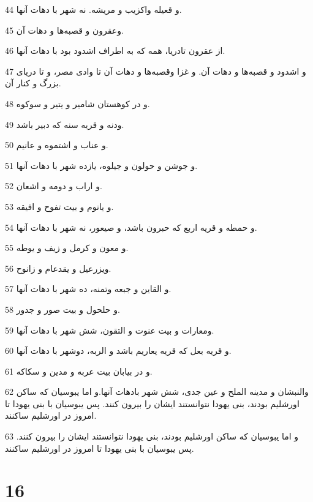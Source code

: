 \par 44 و قعیله واکزیب و مریشه. نه شهر با دهات آنها.
\par 45 وعقرون و قصبه‌ها و دهات آن.
\par 46 از عقرون تادریا، همه که به اطراف اشدود بود با دهات آنها.
\par 47 و اشدود و قصبه‌ها و دهات آن. و غزا وقصبه‌ها و دهات آن تا وادی مصر، و تا دریای بزرگ و کنار آن.
\par 48 و در کوهستان شامیر و یتیر و سوکوه.
\par 49 ودنه و قریه سنه که دبیر باشد.
\par 50 و عناب و اشتموه و عانیم.
\par 51 و جوشن و حولون و جیلوه، یازده شهر با دهات آنها.
\par 52 و اراب و دومه و اشعان.
\par 53 و یانوم و بیت تفوح و افیقه.
\par 54 و حمطه و قریه اربع که حبرون باشد، و صیعور، نه شهر با دهات آنها.
\par 55 و معون و کرمل و زیف و یوطه.
\par 56 ویزرعیل و یقدعام و زانوح.
\par 57 و القاین و جبعه وتمنه، ده شهر با دهات آنها.
\par 58 و حلحول و بیت صور و جدور.
\par 59 ومعارات و بیت عنوت و التقون، شش شهر با دهات آنها.
\par 60 و قریه بعل که قریه یعاریم باشد و الربه، دوشهر با دهات آنها.
\par 61 و در بیابان بیت عربه و مدین و سکاکه.
\par 62 والنبشان و مدینه الملح و عین جدی، شش شهر بادهات آنها.و اما یبوسیان که ساکن اورشلیم بودند، بنی یهودا نتوانستند ایشان را بیرون کنند. پس یبوسیان با بنی یهودا تا امروز در اورشلیم ساکنند.
\par 63 و اما یبوسیان که ساکن اورشلیم بودند، بنی یهودا نتوانستند ایشان را بیرون کنند. پس یبوسیان با بنی یهودا تا امروز در اورشلیم ساکنند.
 
\chapter{16}

